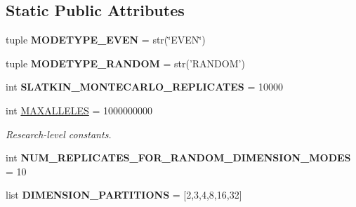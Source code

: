 \subsection*{Static Public Attributes}
\begin{DoxyCompactItemize}
\item 
\hypertarget{classctpy_1_1utils_1_1configuration_1_1_c_t_py_configuration_aa813fec1e5c80d6e14b66f45c80f1b60}{tuple {\bfseries M\-O\-D\-E\-T\-Y\-P\-E\-\_\-\-E\-V\-E\-N} = str(\char`\"{}E\-V\-E\-N\char`\"{})}\label{classctpy_1_1utils_1_1configuration_1_1_c_t_py_configuration_aa813fec1e5c80d6e14b66f45c80f1b60}

\item 
\hypertarget{classctpy_1_1utils_1_1configuration_1_1_c_t_py_configuration_aa071918fa157efea06a7b19f8032d6e4}{tuple {\bfseries M\-O\-D\-E\-T\-Y\-P\-E\-\_\-\-R\-A\-N\-D\-O\-M} = str('R\-A\-N\-D\-O\-M')}\label{classctpy_1_1utils_1_1configuration_1_1_c_t_py_configuration_aa071918fa157efea06a7b19f8032d6e4}

\item 
\hypertarget{classctpy_1_1utils_1_1configuration_1_1_c_t_py_configuration_a07120c4edf79fb3d8dd463f94673ba48}{int {\bfseries S\-L\-A\-T\-K\-I\-N\-\_\-\-M\-O\-N\-T\-E\-C\-A\-R\-L\-O\-\_\-\-R\-E\-P\-L\-I\-C\-A\-T\-E\-S} = 10000}\label{classctpy_1_1utils_1_1configuration_1_1_c_t_py_configuration_a07120c4edf79fb3d8dd463f94673ba48}

\item 
\hypertarget{classctpy_1_1utils_1_1configuration_1_1_c_t_py_configuration_ae612fd6b9bfbead69156fc7d28d15a38}{int \hyperlink{classctpy_1_1utils_1_1configuration_1_1_c_t_py_configuration_ae612fd6b9bfbead69156fc7d28d15a38}{M\-A\-X\-A\-L\-L\-E\-L\-E\-S} = 1000000000}\label{classctpy_1_1utils_1_1configuration_1_1_c_t_py_configuration_ae612fd6b9bfbead69156fc7d28d15a38}

\begin{DoxyCompactList}\small\item\em Research-\/level constants. \end{DoxyCompactList}\item 
\hypertarget{classctpy_1_1utils_1_1configuration_1_1_c_t_py_configuration_ab30a00cf60918969bf12fd0a4e7369a0}{int {\bfseries N\-U\-M\-\_\-\-R\-E\-P\-L\-I\-C\-A\-T\-E\-S\-\_\-\-F\-O\-R\-\_\-\-R\-A\-N\-D\-O\-M\-\_\-\-D\-I\-M\-E\-N\-S\-I\-O\-N\-\_\-\-M\-O\-D\-E\-S} = 10}\label{classctpy_1_1utils_1_1configuration_1_1_c_t_py_configuration_ab30a00cf60918969bf12fd0a4e7369a0}

\item 
\hypertarget{classctpy_1_1utils_1_1configuration_1_1_c_t_py_configuration_a89842ee405e327fa3693ed6c18a76528}{list {\bfseries D\-I\-M\-E\-N\-S\-I\-O\-N\-\_\-\-P\-A\-R\-T\-I\-T\-I\-O\-N\-S} = \mbox{[}2,3,4,8,16,32\mbox{]}}\label{classctpy_1_1utils_1_1configuration_1_1_c_t_py_configuration_a89842ee405e327fa3693ed6c18a76528}


\end{DoxyCompactItemize}
